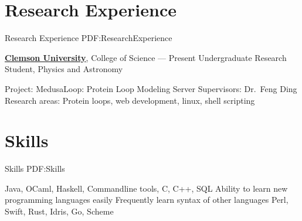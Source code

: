 \documentclass[letterpaper,10pt,oneside]{simpleresumecv}
\newcommand{\CVNote}{Resume compiled on {\today} for Apple}
\begin{document}
\begin{body}
\section%
{Research Experience}
{Research Experience}
{PDF:ResearchExperience}

\href{https://www.clemson.edu}
{\textbf{Clemson University}},
College of Science
\hfill
{} --- Present
\BulletItem%
Undergraduate Research Student, Physics and Astronomy
\begin{detail}
\SubBulletItem%
Project:
MedusaLoop: Protein Loop Modeling Server
\SubBulletItem%
Supervisors:
Dr.\ Feng Ding
\SubBulletItem%
Research areas:
Protein loops, web development, linux, shell scripting
\end{detail}


\section%
{Skills}
{Skills}
{PDF:Skills}

\BulletItem%
Java, OCaml, Haskell, Commandline tools, C, C++, SQL
\BulletItem%
Ability to learn new programming languages easily
\SubBulletItem%
Frequently learn syntax of other languages
\SubBulletItem%
Perl, Swift, Rust, Idris, Go, Scheme


\end{body}


\label{LastPage}~%
\end{document}
